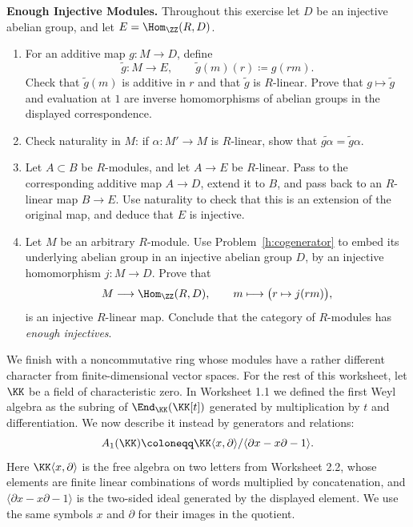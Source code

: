\documentclass[12pt,reqno]{amsart}
\begin{document}
\hrulefill

\begin{problems}
\item\label{h:enough-injectives} \textbf{Enough Injective Modules.} Throughout this exercise let $D$ be an injective abelian group, and let $E=\Hom_{\ZZ}(R,D)$.
\begin{enumerate}
\item For an additive map $g:M\to D$, define
\[
\widetilde g:M\longrightarrow E,\qquad\widetilde g(m)(r)\coloneqq g(rm).
\]
Check that $\widetilde g(m)$ is additive in $r$ and that $\widetilde g$ is $R$-linear. Prove that $g\mapsto\widetilde g$ and evaluation at $1$ are inverse homomorphisms of abelian groups in the displayed correspondence.
\item Check naturality in $M$: if $\alpha:M'\to M$ is $R$-linear, show that $\widetilde{g\alpha}=\widetilde g\alpha$.
\item Let $A\subset B$ be $R$-modules, and let $A\to E$ be $R$-linear. Pass to the corresponding additive map $A\to D$, extend it to $B$, and pass back to an $R$-linear map $B\to E$. Use naturality to check that this is an extension of the original map, and deduce that $E$ is injective.
\item Let $M$ be an arbitrary $R$-module. Use Problem~\ref{h:cogenerator} to embed its underlying abelian group in an injective abelian group $D$, by an injective homomorphism $j:M\to D$. Prove that
\[
M\longrightarrow\Hom_{\ZZ}(R,D),\qquad m\longmapsto\bigl(r\mapsto j(rm)\bigr),
\]
is an injective $R$-linear map. Conclude that the category of $R$-modules has \emph{enough injectives}.
\end{enumerate}
\end{problems}

\hrulefill

We finish with a noncommutative ring whose modules have a rather different character from finite-dimensional vector spaces. For the rest of this worksheet, let $\KK$ be a field of characteristic zero. In Worksheet 1.1 we defined the first Weyl algebra as the subring of $\End_{\KK}(\KK[t])$ generated by multiplication by $t$ and differentiation. We now describe it instead by generators and relations:
\[
A_1(\KK)\coloneqq\KK\langle x,\partial\rangle/\langle\partial x-x\partial-1\rangle.
\]
Here $\KK\langle x,\partial\rangle$ is the free algebra on two letters from Worksheet 2.2, whose elements are finite linear combinations of words multiplied by concatenation, and $\langle\partial x-x\partial-1\rangle$ is the two-sided ideal generated by the displayed element. We use the same symbols $x$ and $\partial$ for their images in the quotient.
\end{document}
